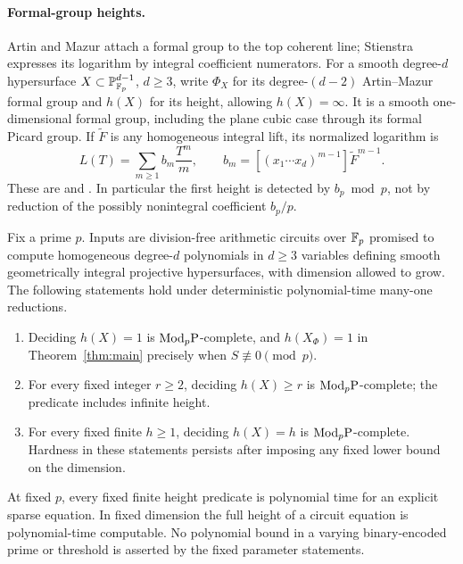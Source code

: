 \paragraph{Formal-group heights.}
Artin and Mazur attach a formal group to the top coherent line;
Stienstra expresses its logarithm by integral coefficient numerators.
For a smooth degree-$d$ hypersurface $X\subset\mathbb P^{d-1}_{\mathbb F_p}$,
$d\ge3$, write $\Phi_X$ for its degree-$(d-2)$ Artin--Mazur formal
group and $h(X)$ for its height, allowing $h(X)=\infty$.
It is a smooth one-dimensional formal group, including the plane cubic
case through its formal Picard group. If $\widetilde F$ is any
homogeneous integral lift, its normalized logarithm is
\[
 L(T)=\sum_{m\ge1}b_m\frac{T^m}{m},\qquad
 b_m=[(x_1\cdots x_d)^{m-1}]\widetilde F^{m-1}.
\]
These are \citet[II, Corollaries~2.11--2.12 and~4.2,
pp.~106--110]{fg-artin-mazur} and
\citet[Theorem~1, p.~907]{fg-stienstra}. In particular the first height
is detected by $b_p\bmod p$, not by reduction of the possibly
nonintegral coefficient $b_p/p$.

\begin{theorem}\label{fg:thm:complexity-intro}
Fix a prime $p$. Inputs are division-free arithmetic circuits over $\mathbb F_p$
promised to compute homogeneous degree-$d$ polynomials in $d\ge3$
variables defining smooth geometrically integral projective
hypersurfaces, with dimension allowed to grow. The following statements
hold under deterministic polynomial-time many-one reductions.
\begin{enumerate}
\item Deciding $h(X)=1$ is $\mathrm{Mod}_p\mathrm P$-complete, and
      $h(X_\Phi)=1$ in Theorem~\ref{thm:main} precisely when
      $S\not\equiv0\pmod p$.
\item For every fixed integer $r\ge2$, deciding $h(X)\ge r$ is
      $\mathrm{Mod}_p\mathrm P$-complete; the predicate includes infinite height.
\item For every fixed finite $h\ge1$, deciding $h(X)=h$ is
      $\mathrm{Mod}_p\mathrm P$-complete. Hardness in these statements persists after
      imposing any fixed lower bound on the dimension.
\end{enumerate}
At fixed $p$, every fixed finite height predicate is polynomial time for
an explicit sparse equation. In fixed dimension the full height of a
circuit equation is polynomial-time computable. No polynomial bound in
a varying binary-encoded prime or threshold is asserted by the fixed
parameter statements.
\end{theorem}

